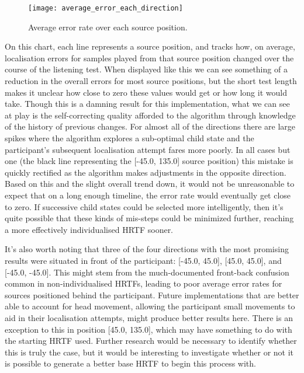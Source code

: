 \begin{figure}
	\caption{Average error rate over each source position.}
	\centering
		\texttt{[image: average\_error\_each\_direction]}
	
\end{figure}

On this chart, each line represents a source position, and tracks how, on average, localisation errors for samples played from that source position changed over the course of the listening test. When displayed like this we can see something of a reduction in the overall errors for most source positions, but the short test length makes it unclear how close to zero these values would get or how long it would take. Though this is a damning result for this implementation, what we can see at play is the self-correcting quality afforded to the algorithm through knowledge of the history of previous changes. For almost all of the directions there are large spikes where the algorithm explores a sub-optimal child state and the participant's subsequent localisation attempt fares more poorly. In all cases but one (the black line representing the [-45.0, 135.0] source position) this mistake is quickly rectified as the algorithm makes adjustments in the opposite direction. Based on this and the slight overall trend down, it would not be unreasonable to expect that on a long enough timeline, the error rate would eventually get close to zero. If successive child states could be selected more intelligently, then it's quite possible that these kinds of mis-steps could be minimized further, reaching a more effectively individualised HRTF sooner.

It's also worth noting that three of the four directions with the most promising results were situated in front of the participant: [-45.0, 45.0], [45.0, 45.0], and [-45.0, -45.0]. This might stem from the much-documented front-back confusion common in non-individualised HRTFs, leading to poor average error rates for sources positioned behind the participant. Future implementations that are better able to account for head movement, allowing the participant small movements to aid in their localisation attempts, might produce better results here. There is an exception to this in position [45.0, 135.0], which may have something to do with the starting HRTF used. Further research would be necessary to identify whether this is truly the case, but it would be interesting to investigate whether or not it is possible to generate a better base HRTF to begin this process with.

